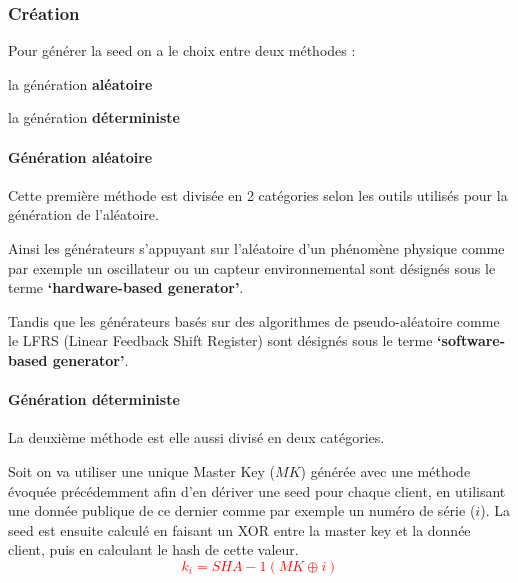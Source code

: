 \documentclass[a4paper, 10pt]{article}
\begin{document}
            \subsubsection{Création}

\noindent
Pour générer la seed on a le choix entre deux méthodes :
\begin{gitemize}
    

    \item la génération \textcolor{myblue}{\textbf{aléatoire}}
    \item la génération \textcolor{myblue}{\textbf{déterministe}}
\end{gitemize}


\paragraph*{Génération aléatoire\\}

Cette première méthode est divisée en 2 catégories selon les outils utilisés pour la génération de l’aléatoire.

Ainsi les générateurs s’appuyant sur l’aléatoire d’un \textcolor{mygreen}{phénomène physique} comme par exemple un oscillateur ou un capteur environnemental sont désignés sous le terme \textbf{\textcolor{myblue}{‘hardware-based generator’}}.

Tandis que les générateurs basés sur des \textcolor{mygreen}{algorithmes de pseudo-aléatoire} comme le LFRS (Linear Feedback Shift Register) sont désignés sous le terme \textbf{\textcolor{myblue}{‘software-based generator’}}.


\paragraph*{Génération déterministe\\}

La deuxième méthode est elle aussi divisé en deux catégories.

Soit on va utiliser une \textcolor{myblue}{unique Master Key} \textcolor{mygreen}{($MK$)} générée avec une méthode évoquée précédemment afin d’en \textcolor{myblue}{dériver une seed} pour chaque client,
en utilisant une \textcolor{mygreen}{donnée publique} de ce dernier comme par exemple un numéro de série \textcolor{mygreen}{($i$)}.
La seed est ensuite calculé en faisant un XOR entre la master key et la donnée client, puis en calculant le hash de cette valeur.
\textcolor{red}{$$
    k_i = SHA-1(MK \oplus i)
$$}
\end{document}
